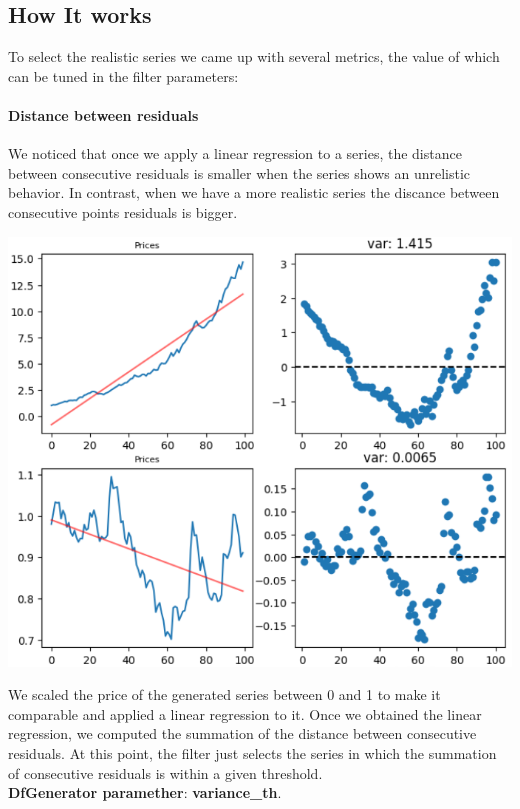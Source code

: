 \documentclass{article}
\begin{document}
\begin{multicols}{2}
    \section*{How It works}
    To select the realistic series we came up with several metrics, the value of which can be tuned in the filter parameters:
    \paragraph*{Distance between residuals}
    We noticed that once we apply a linear regression to a series, the distance between consecutive residuals is smaller when the series shows an unrelistic behavior.
    In contrast, when we have a more realistic series the discance between consecutive points residuals is bigger.
    \begin{center}
        \includegraphics[scale=0.6]{imgs/riccardo/2_res.png}
    \end{center}
    We scaled the price of the generated series between 0 and 1 to make it comparable and applied a linear regression to it. Once we obtained the linear regression, we computed the summation of the distance between consecutive residuals. 
    At this point, the filter just selects the series in which the summation of consecutive residuals is within a given threshold.\\
    \textbf{DfGenerator paramether}:  \textbf{variance\_th}.

\end{multicols}
\end{document}
